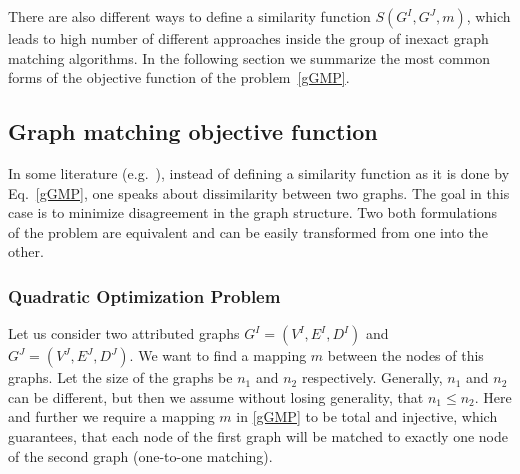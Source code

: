 There are also different ways to define a similarity function $S(G^I,G^J,m)$, which leads to high number of different approaches inside the group of inexact graph matching algorithms. In the following section we summarize the most common forms of the objective function of the problem~\eqref{gGMP}.
\subsection{Graph matching objective function}
In some literature (e.g.~\cite{Herault1990_SimulatedAnnealing,FastPFP,Lyzinski2015,Roth2001,Vogelstein_BrainGraphs,Zazlavskiy2008_PATH}), instead of defining a similarity function as it is done by Eq.~\eqref{gGMP}, one speaks about dissimilarity between two graphs. The goal in this case is to minimize disagreement in the graph structure. Two both formulations of the problem are equivalent and can be easily transformed from one into the other.
\subsubsection{Quadratic Optimization Problem}
Let us consider two attributed graphs $G^I = (V^I, E^I,D^I)$ and $G^J = (V^J, E^J,D^J)$. We want to find a mapping $m$ between the nodes of this graphs. Let the size of the graphs be $n_1$ and $n_2$ respectively. Generally, $n_1$ and $n_2$ can be different, but then we assume without losing generality, that $n_1\le n_2$. Here and further we require a mapping $m$ in \eqref{gGMP} to be total and injective, which guarantees, that each node of the first graph will be matched to exactly one node of the second graph (one-to-one matching). 

